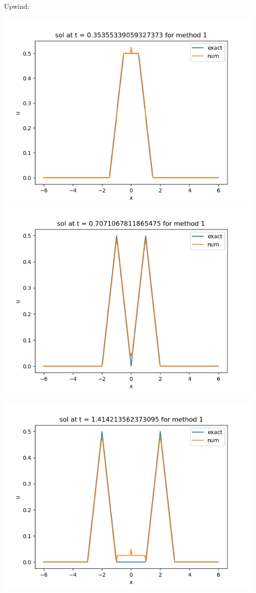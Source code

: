 \documentclass{article}
\begin{document}
\begin{enumerate}[label=(\alph*)]
Upwind:
\begin{center}
	\includegraphics[scale=.4]{hw11 sol n = 10 method 1}
	\includegraphics[scale=.4]{hw11 sol n = 20 method 1}
\end{center}
\begin{center}
	\includegraphics[scale=.4]{hw11 sol n = 40 method 1}

\end{center}
\end{enumerate}
\end{document}

